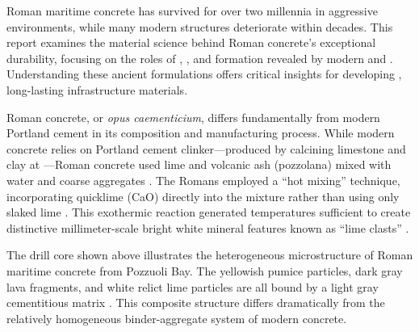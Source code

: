 Roman maritime concrete has survived for over two millennia in aggressive  environments, while many modern  structures deteriorate within decades. This report examines the material science behind Roman concrete's exceptional durability, focusing on the roles of , , and  formation revealed by modern  and . Understanding these ancient formulations offers critical insights for developing , long-lasting infrastructure materials.

Roman concrete, or \emph{opus caementicium}, differs fundamentally from modern Portland cement in its composition and manufacturing process. While modern concrete relies on Portland cement clinker---produced by calcining limestone and clay at ---Roman concrete used lime and volcanic ash (pozzolana) mixed with water and coarse aggregates . The Romans employed a ``hot mixing'' technique, incorporating quicklime (CaO) directly into the mixture rather than using only slaked lime . This exothermic reaction generated temperatures sufficient to create distinctive millimeter-scale bright white mineral features known as ``lime clasts'' .

The drill core shown above illustrates the heterogeneous microstructure of Roman maritime concrete from Pozzuoli Bay. The yellowish pumice particles, dark gray lava fragments, and white relict lime particles are all bound by a light gray cementitious matrix . This composite structure differs dramatically from the relatively homogeneous binder-aggregate system of modern concrete.

